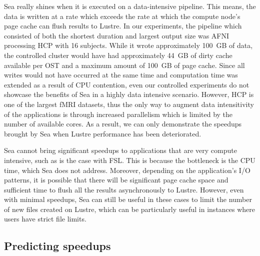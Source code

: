     Sea really shines when it is executed on a data-intensive pipeline. This
    means, the data is written at a rate which exceeds the rate at which the
    compute node's page cache can flush results to Lustre. In our experiments,
    the pipeline which consisted of both the shortest duration and largest
    output size was AFNI processing HCP with 16 subjects. While it wrote
    approximately 100~GB of data, the controlled cluster would have had
    approximately 44~GB of dirty cache available per OST and a maximum amount of
    100~GB of page cache. Since all writes would not have occurred at the same
    time and computation time was extended as a result of CPU contention, even
    our controlled experiments do not showcase the benefits of Sea in a highly
    data intensive scenario. However, HCP is one of the largest fMRI datasets,
    thus the only way to augment data intensitivity of the applications is
    through increased parallelism which is limited by the number of available
    cores. As a result, we can only demonstrate the speedups brought by Sea when
    Lustre performance has been deteriorated.


    Sea cannot bring significant speedups to applications that are very compute intensive,
    such as is the case with FSL. This is because the bottleneck is the CPU time, which Sea
    does not address. Moreover, depending on the application's I/O patterns, it is possible
    that there will be significant page cache space and sufficient time to flush all the
    results asynchronously to Lustre. However, even with minimal speedups, Sea can still be
    useful in these cases to limit the number of new files created on Lustre, which can be particularly
    useful in instances where users have strict file limits.


    \subsection{Predicting speedups}


